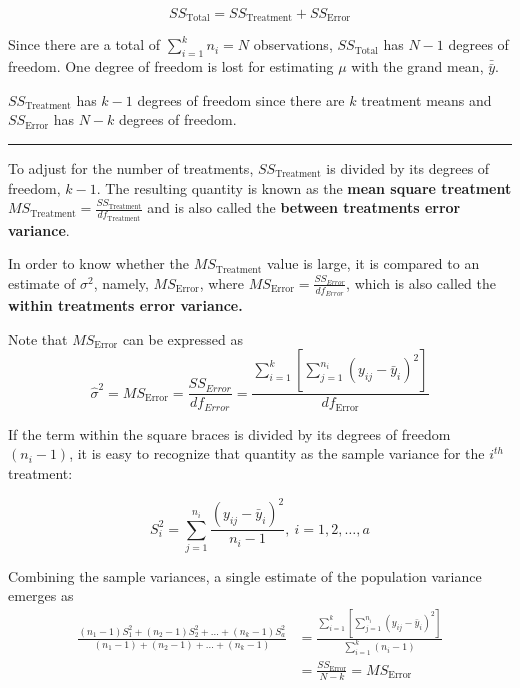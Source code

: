 \documentclass[
]{article}
\begin{document}
\begin{equation}
SS_\text{Total} = SS_\text{Treatment} + SS_\text{Error}
\end{equation}

Since there are a total of \(\sum_{i=1}^k n_i= N\) observations, \(SS_\text{Total}\) has \(N-1\) degrees of freedom. One degree of freedom is lost for estimating \(\mu\) with the grand mean, \(\bar{\bar{y}}\).

\(SS_\text{Treatment}\) has \(k-1\) degrees of freedom since there are \(k\) treatment means and \(SS_\text{Error}\) has \(N-k\) degrees of freedom.

\begin{center}\rule{0.5\linewidth}{0.5pt}\end{center}

To adjust for the number of treatments, \(SS_\text{Treatment}\) is divided by its degrees of freedom, \(k-1\). The
resulting quantity is known as the \textbf{mean square treatment} \(MS_\text{Treatment} = \frac{SS_{\text{Treatment}}}{df_\text{Treatment}}\) and is also called the \textbf{between treatments error variance}.

In order to know whether the \(MS_\text{Treatment}\) value is large, it is compared to an estimate of \(\sigma^2\), namely, \(MS_\text{Error}\), where \(MS_\text{Error} = \frac{SS_{Error}}{df_{Error}}\), which is also called the \textbf{within treatments error variance.}

Note that \(MS_\text{Error}\) can be expressed as
\begin{equation}\label{MSerrorEQ}
\hat\sigma^2 = MS_\text{Error} = \frac{SS_{Error}}{df_{Error}} =
\frac{\sum_{i=1}^k \left[ \sum_{j=1}^{n_i} (y_{ij} - \bar{y}_i
)^2\right]}{df_\text{Error}}
\end{equation}

If the term within the square braces is divided by its degrees of freedom
\((n_i-1)\), it is easy to recognize that quantity as the sample variance for the
\(i^{th}\) treatment:

\begin{equation}\label{sampvarithEQ}
S^2_i = \sum_{j=1}^{n_i} \frac{(y_{ij} - \bar{y}_i)^2}{n_i-1}, \: i=1,  2,  \dots, a
\end{equation}

Combining the sample variances, a single estimate of the population variance emerges as
\begin{align*}
\frac{(n_1-1) S^2_1 +(n_2-1)S^2_2+ \dots + (n_k-1)S^2_a}{(n_1-1) +(n_2-1)+
\dots + (n_k-1)} &= \frac{\sum_{i=1}^k \left[ \sum_{j=1}^{n_i} (y_{ij} -
\bar{y}_i)^2 \right]}{\sum_{i=1}^k (n_i-1)}\\
&= \frac{SS_\text{Error}}{N-k} = MS_\text{Error}
\end{align*}
\end{document}
